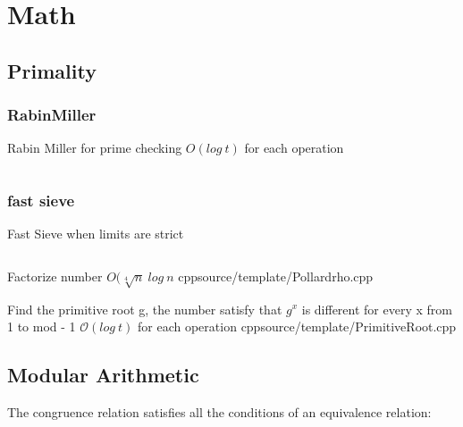 \section{Math}
\subsection{Primality}
\subsubsection{RabinMiller}
Rabin Miller for prime checking
${O}(log \ t)$ for each operation
\inputminted[]{cpp}{source/template/RabinMiller.cpp}

\subsubsection{fast sieve}
Fast Sieve when limits are strict
\inputminted[]{cpp}{source/template/fastsieve.cpp}

{Factorize number}
{$O(\sqrt[4]{n} \ log \ n$}
{cpp}{source/template/Pollardrho.cpp}

{Find the primitive root g, the number satisfy that $g^x$ is different for every x from 1 to mod - 1}
{$\mathcal{O}(log \ t)$ for each operation}
{cpp}{source/template/PrimitiveRoot.cpp}


\subsection{Modular Arithmetic}
The congruence relation satisfies all the conditions of an equivalence relation:

